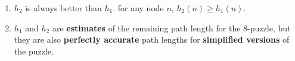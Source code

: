 \begin{enumerate}[itemsep=0.2cm]
    \item $h_2$ is always better than $h_1$.
    for any node $n$, $h_2(n) \geq h_1(n)$.
    \hfill \cite{ai/book/Artificial-Intelligence-A-Modern-Approach/Russell-Norvig}

    \item $h_1$ and $h_2$ are \textbf{estimates} of the remaining path length for the $8$-puzzle, but they are also \textbf{perfectly accurate} path lengths for \textbf{simplified versions} of the puzzle.
    \hfill \cite{ai/book/Artificial-Intelligence-A-Modern-Approach/Russell-Norvig}

    
\end{enumerate}







